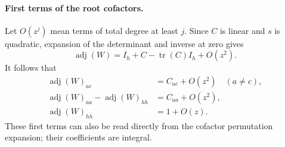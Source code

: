 \paragraph{First terms of the root cofactors.}
Let \(O(z^j)\) mean terms of total degree at least \(j\).
Since \(C\) is linear and \(s\) is quadratic, expansion
of the determinant and inverse at zero gives
\[
 \operatorname{adj}(W)
     =I_h+C-\operatorname{tr}(C)I_h+O(z^2).
\]
It follows that
\[
 \begin{split}
 \operatorname{adj}(W)_{ac}&=C_{ac}+O(z^2)\quad(a\ne c),\\
 \operatorname{adj}(W)_{aa}-\operatorname{adj}(W)_{hh}
                 &=C_{aa}+O(z^2),\\
 \operatorname{adj}(W)_{hh}&=1+O(z).
 \end{split}                                             \tag{M-016.5}
\]
These first terms can also be read directly from the
cofactor permutation expansion; their coefficients are integral.


